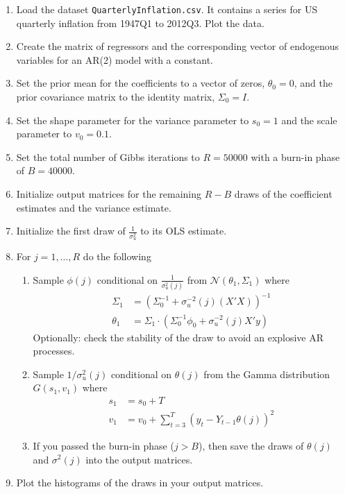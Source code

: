 \begin{enumerate}

\item Load the dataset \texttt{QuarterlyInflation.csv}.
It contains a series for US quarterly inflation from 1947Q1 to 2012Q3.
Plot the data.

\item Create the matrix of regressors and the corresponding vector of endogenous variables for an AR{(2)} model with a constant.

\item Set the prior mean for the coefficients to a vector of zeros, \(\theta_0 = 0\),
  and the prior covariance matrix to the identity matrix, \(\Sigma_{0}=I\).

\item Set the shape parameter for the variance parameter to \(s_0=1\)
  and the scale parameter to \(v_0=0.1\).

\item Set the total number of Gibbs iterations to \(R=50000\) with a burn-in phase of \(B=40000\).

\item Initialize output matrices for the remaining \(R-B\) draws of the coefficient estimates and the variance estimate.

\item Initialize the first draw of \(\frac{1}{\sigma_u^2}\) to its OLS estimate.

\item For \(j=1,\ldots ,R\) do the following

\begin{enumerate}

  \item Sample \(\phi(j)\) conditional on \(\frac{1}{\sigma_u^2(j)}\) from \(\mathcal{N}(\theta_1,\Sigma_{1})\) where
  \begin{align*}
  \Sigma_{1} &= {(\Sigma_{0}^{-1} +\sigma_u^{-2}(j)(X'X))}^{-1}
  \\
  \theta_1 &= \Sigma_{1} \cdot (\Sigma_{0}^{-1}\phi_0 + \sigma_u^{-2}(j) X'y)
  \end{align*}
  Optionally: check the stability of the draw to avoid an explosive AR processes.

  \item Sample \(1/\sigma_u^2(j)\) conditional on \(\theta(j)\) from the Gamma distribution \(G(s_1,v_1)\)
  where
  \begin{align*}
  s_1 &= s_0 + T
  \\
  v_1 &= v_0 + \sum_{t=3}^T {(y_t-Y_{t-1}\theta(j))}^2
  \end{align*}

  \item If you passed the burn-in phase (\(j>B\)),
    then save the draws of \(\theta(j)\) and \(\sigma^2(j)\) into the output matrices.

\end{enumerate}

\item Plot the histograms of the draws in your output matrices.

\end{enumerate}

